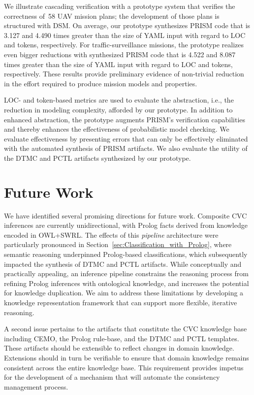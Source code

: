 We illustrate cascading verification with a prototype system that verifies the correctness of~58 UAV mission plans; the development of those plans is structured with DSM\@. On average, our prototype synthesizes PRISM code that is 3.127 and 4.490 times greater than the size of YAML input with regard to LOC and tokens, respectively. For traffic-surveillance missions, the prototype realizes even bigger reductions with synthesized PRISM code that is 4.522 and 8.087 times greater than the size of YAML input with regard to LOC and tokens, respectively. These results provide preliminary evidence of non-trivial reduction in the effort required to produce mission models and properties.

LOC- and token-based metrics are used to evaluate the abstraction, i.e., the reduction in modeling complexity, afforded by our prototype. In addition to enhanced abstraction, the prototype augments PRISM's verification capabilities and thereby enhances the effectiveness of probabilistic model checking. We evaluate effectiveness by presenting errors that can only be effectively eliminated with the automated synthesis of PRISM artifacts. We also evaluate the utility of the DTMC and PCTL artifacts synthesized by our prototype.

\section{Future Work}
\label{sec:Future_Work}

We have identified several promising directions for future work. Composite CVC inferences are currently unidirectional, with Prolog facts derived from knowledge encoded in OWL+SWRL\@. The effects of this \emph{pipeline} architecture were particularly pronounced in Section~\ref{sec:Classification_with_Prolog}, where semantic reasoning underpinned Prolog-based classifications, which subsequently impacted the synthesis of DTMC and PCTL artifacts. While conceptually and practically appealing, an inference pipeline constrains the reasoning process from refining Prolog inferences with ontological knowledge, and increases the potential for knowledge duplication. We aim to address these limitations by developing a knowledge representation framework that can support more flexible, iterative reasoning.

A second issue pertains to the artifacts that constitute the CVC knowledge base including CEMO, the Prolog rule-base, and the DTMC and PCTL templates. These artifacts should be extensible to reflect changes in domain knowledge. Extensions should in turn be verifiable to ensure that domain knowledge remains consistent across the entire knowledge base. This requirement provides impetus for the development of a mechanism that will automate the consistency management process.

